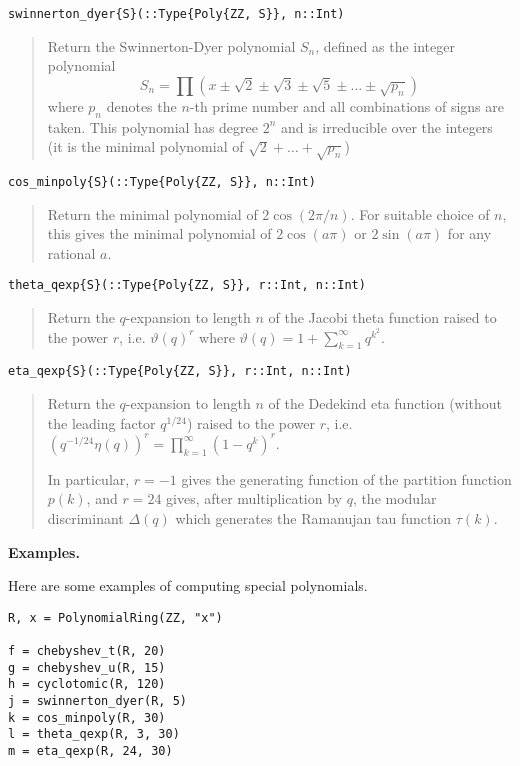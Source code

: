 \documentclass[a4paper,10pt]{article}
\newcommand{\desc}[1]{\vspace{-3mm}\begin{quote}#1\end{quote}}
\begin{document}
{{\begin{lstlisting}
swinnerton_dyer{S}(::Type{Poly{ZZ, S}}, n::Int)
\end{lstlisting}

\desc{Return the Swinnerton-Dyer polynomial $S_n$, defined as the integer 
polynomial $$S_n = \prod (x \pm \sqrt{2} \pm \sqrt{3}
\pm \sqrt{5} \pm \ldots \pm \sqrt{p_n})$$ where $p_n$ denotes the $n$-th prime 
number and all combinations of signs are taken. This polynomial has degree $2^n$
and is irreducible over the integers (it is the minimal polynomial of 
$\sqrt{2} + \ldots + \sqrt{p_n}$)}

\begin{lstlisting}
cos_minpoly{S}(::Type{Poly{ZZ, S}}, n::Int)
\end{lstlisting}

\desc{Return the minimal polynomial of $2 \cos(2 \pi / n)$. For suitable choice of 
$n$, this gives the minimal polynomial of $2 \cos(a \pi)$ or $2 \sin(a \pi)$ for any
rational $a$.}

\begin{lstlisting}
theta_qexp{S}(::Type{Poly{ZZ, S}}, r::Int, n::Int)
\end{lstlisting}

\desc{Return the $q$-expansion to length $n$ of the Jacobi theta function raised to 
the power $r$, i.e. $\vartheta(q)^r$ where 
$\vartheta(q) = 1 + \sum_{k=1}^{\infty} q^{k^2}$.}

\begin{lstlisting}
eta_qexp{S}(::Type{Poly{ZZ, S}}, r::Int, n::Int)
\end{lstlisting}

\desc{Return the $q$-expansion to length $n$ of the Dedekind eta function (without 
the leading factor $q^{1/24}$) raised to the power $r$, i.e. $(q^{-1/24} \eta(q))^r 
= \prod_{k=1}^{\infty} (1 - q^k)^r$.

In particular, $r = -1$ gives the generating function of the partition function $p(k)$, 
and $r = 24$ gives, after multiplication by $q$, the modular discriminant $\Delta(q)$ 
which generates the Ramanujan tau function $\tau(k)$.}

\textbf{Examples.}

Here are some examples of computing special polynomials.

\begin{lstlisting}
R, x = PolynomialRing(ZZ, "x")

f = chebyshev_t(R, 20)
g = chebyshev_u(R, 15)
h = cyclotomic(R, 120)
j = swinnerton_dyer(R, 5)
k = cos_minpoly(R, 30)
l = theta_qexp(R, 3, 30)
m = eta_qexp(R, 24, 30)
\end{lstlisting}

}}
\end{document}
